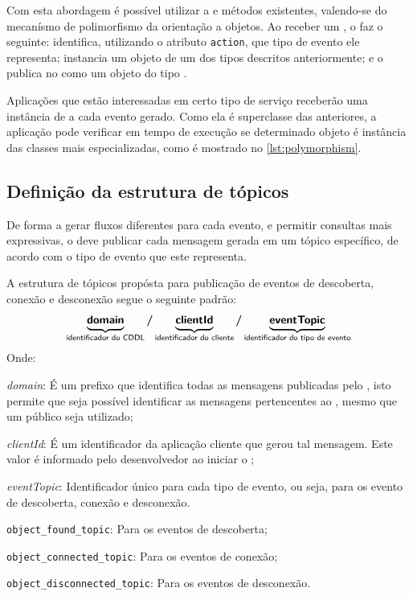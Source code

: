 Com esta abordagem é possível utilizar a \api e métodos existentes, valendo-se do mecanísmo de polimorfismo da orientação a objetos.
Ao receber um \sensordata, o \qocevaluator faz o seguinte: identifica, utilizando o atributo \texttt{action}, que tipo de evento ele representa; instancia um objeto de um dos tipos descritos anteriormente; e o publica no \broker \mqtt como um objeto do tipo \msg.

Aplicações que estão interessadas em certo tipo de serviço receberão uma instância de \msg a cada evento gerado.
Como ela é superclasse das anteriores, a aplicação pode verificar em tempo de execução se determinado objeto é instância das classes mais especializadas, como é mostrado no \autoref{lst:polymorphism}.



\subsection{Definição da estrutura de tópicos}

De forma a gerar fluxos diferentes para cada evento, e permitir consultas mais expressivas, o \qocevaluator deve publicar cada mensagem gerada em um tópico específico, de acordo com o tipo de evento que este representa.

A estrutura de tópicos propósta para publicação de eventos de descoberta, conexão e desconexão segue o seguinte padrão:
\[
	\underbrace{\bm{\mathsf{domain}}\vphantom{p}}_{\text{\textsf{identificador do CDDL}}}
	\bm{/}
	\underbrace{\bm{\mathsf{clientId}}\vphantom{p}}_{\text{\textsf{identificador do cliente}}}
	\bm{/}
	\underbrace{\bm{\mathsf{eventTopic}}}_{\text{\textsf{identificador do tipo de evento}}}
\]
Onde:

\begin{alineas}
	\item \emph{domain}: É um prefixo que identifica todas as mensagens publicadas pelo \cddl, isto permite que seja possível identificar as mensagens pertencentes ao \middleware, mesmo que um \broker público seja utilizado;
	\item \emph{clientId}: É um identificador da aplicação cliente que gerou tal mensagem. Este valor é informado pelo desenvolvedor ao iniciar o \cddl;
	\item \emph{eventTopic}: Identificador único para cada tipo de evento, ou seja, para os evento de descoberta, conexão e desconexão.
	\begin{alineas}
		\item \texttt{object\_found\_topic}: Para os eventos de descoberta;
		\item \texttt{object\_connected\_topic}: Para os eventos de conexão;
		\item \texttt{object\_disconnected\_topic}: Para os eventos de desconexão.
	\end{alineas}
\end{alineas}

